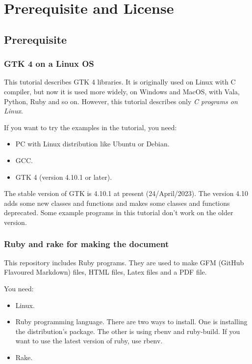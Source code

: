 \section{Prerequisite and License}\label{prerequisite-and-license}

\subsection{Prerequisite}\label{prerequisite}

\subsubsection{GTK 4 on a Linux OS}\label{gtk-4-on-a-linux-os}

This tutorial describes GTK 4 libraries. It is originally used on Linux
with C compiler, but now it is used more widely, on Windows and MacOS,
with Vala, Python, Ruby and so on. However, this tutorial describes only
\emph{C programs on Linux}.

If you want to try the examples in the tutorial, you need:

\begin{itemize}
\tightlist
\item
  PC with Linux distribution like Ubuntu or Debian.
\item
  GCC.
\item
  GTK 4 (version 4.10.1 or later).
\end{itemize}

The stable version of GTK is 4.10.1 at present (24/April/2023). The
version 4.10 adds some new classes and functions and makes some classes
and functions deprecated. Some example programs in this tutorial don't
work on the older version.

\subsubsection{Ruby and rake for making the
document}\label{ruby-and-rake-for-making-the-document}

This repository includes Ruby programs. They are used to make GFM
(GitHub Flavoured Markdown) files, HTML files, Latex files and a PDF
file.

You need:

\begin{itemize}
\tightlist
\item
  Linux.
\item
  Ruby programming language. There are two ways to install. One is
  installing the distribution's package. The other is using rbenv and
  ruby-build. If you want to use the latest version of ruby, use rbenv.
\item
  Rake.
\end{itemize}

